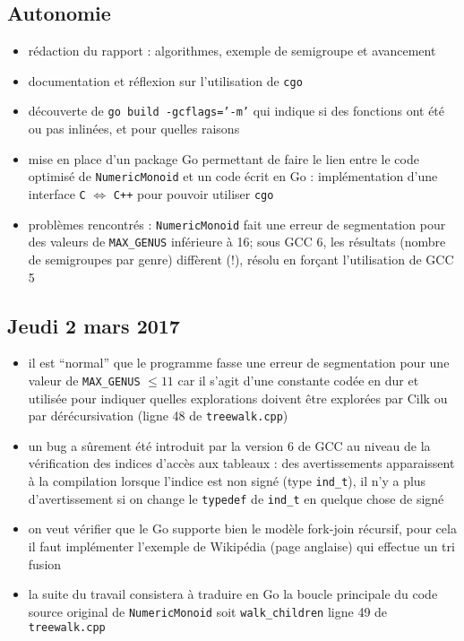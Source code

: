 \documentclass[12pt,a4paper]{article}
\let\leq\leqslant
\begin{document}
\subsection*{Autonomie}
\begin{itemize}
	\item	rédaction du rapport : algorithmes, exemple de semigroupe et avancement
	\item	documentation et réflexion sur l'utilisation de \texttt{cgo}
	\item	découverte de \texttt{go build -gcflags='-m'} qui indique si des fonctions ont été ou pas inlinées, et pour quelles raisons
	\item	mise en place d'un package Go permettant de faire le lien entre le code optimisé de \texttt{NumericMonoid} et un code écrit en Go : implémentation d'une interface \texttt{C} $\Leftrightarrow$ \texttt{C++} pour pouvoir utiliser \texttt{cgo}
	\item	problèmes rencontrés : \texttt{NumericMonoid} fait une erreur de segmentation pour des valeurs de \texttt{MAX\_GENUS} inférieure à 16; sous GCC 6, les résultats (nombre de semigroupes par genre) diffèrent (!), résolu en forçant l'utilisation de GCC 5
\end{itemize}

\subsection*{Jeudi 2 mars 2017}
\begin{itemize}
	\item	il est ``normal'' que le programme fasse une erreur de segmentation pour une valeur de \texttt{MAX\_GENUS} $\leq 11$ car il s'agit d'une constante codée en dur et utilisée pour indiquer quelles explorations doivent être explorées par Cilk ou par dérécursivation (ligne 48 de \texttt{treewalk.cpp})
	\item	un bug a sûrement été introduit par la version 6 de GCC au niveau de la vérification des indices d'accès aux tableaux : des avertissements apparaissent à la compilation lorsque l'indice est non signé (type \texttt{ind\_t}), il n'y a plus d'avertissement si on change le \texttt{typedef} de \texttt{ind\_t} en quelque chose de signé
	\item	on veut vérifier que le Go supporte bien le modèle fork-join récursif, pour cela il faut implémenter l'exemple de Wikipédia (page anglaise) qui effectue un tri fusion
	\item	la suite du travail consistera à traduire en Go la boucle principale du code source original de \texttt{NumericMonoid} soit \texttt{walk\_children} ligne 49 de \texttt{treewalk.cpp}
\end{itemize}
\end{document}
